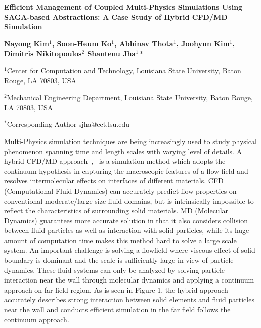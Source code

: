 \documentclass[a4paper]{article}
\newcommand{\Nkimnote}[1]{ {\textcolor{green} { ***Nkim: #1 }}}
\newcommand{\Nkimnote}[1]{}
\begin{document}
\begin{center}


\textbf {\large \bf Efficient Management of Coupled Multi-Physics Simulations
Using SAGA-based Abstractions: A Case Study of  Hybrid CFD/MD Simulation}
\vspace{12pt}

\textbf {\normalsize \hspace{0.6 in} Nayong Kim$^1$, Soon-Heum Ko$^1$, Abhinav Thota$^1$, Joohyun Kim$^1$,   \newline Dimitris Nikitopoulos$^2$    Shantenu Jha$^1*$ }

\vspace{10pt}

\normalsize { \hspace{0.6 in} $^1$Center for Computation and Technology, \newline Louisiana State University, Baton Rouge, LA 70803, USA}

\normalsize {\hspace{0.6 in} $^2$Mechanical Engineering Department, \newline Louisiana State University, Baton Rouge, LA 70803, USA}

\vspace{4pt}
\footnotesize {\hspace{0.0 in} $^*$Corresponding Author sjha@cct.lsu.edu}


\vspace{6pt}

\end{center}

Multi-Physics simulation techniques are being increasingly used to study physical phenomenon spanning time and length scales with varying level of details.  A hybrid CFD/MD approach~\cite{Nie:2004},~\cite{Yen:2007} is a simulation method which adopts the continuum hypothesis in capturing the macroscopic features of a flow-field and resolves intermolecular effects on interfaces of different materials. CFD (Computational Fluid Dynamics) can accurately predict flow properties on conventional moderate/large size fluid domains, but is intrinsically impossible to reflect the characteristics of surrounding solid materials. MD (Molecular Dynamics) guarantees more accurate solution in that it also considers collision between fluid particles as well as interaction with solid particles, while its huge amount of computation time makes this method hard to solve a large scale system. An important challenge is solving a flowfield where viscous effect of solid boundary is dominant and the scale is sufficiently large in view of particle dynamics. These fluid systems can only be analyzed by solving particle interaction near the wall through molecular dynamics and applying a continuum approach on far field region. As is seen in Figure 1, the hybrid approach accurately describes strong interaction between solid elements and fluid particles near the wall and conducts efficient simulation in the far field follows the continuum approach.
\end{document}
